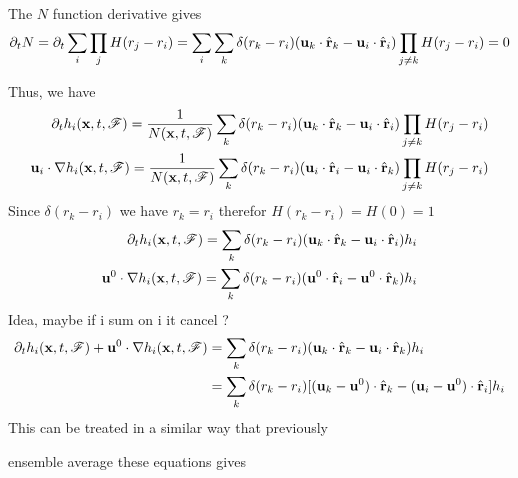 The $N$ function derivative gives 
\begin{equation*}
    \partial_t 
    N 
    = \partial_t 
    \sum_i \prod_j
    H(r_j - r_i)
    = 
    \sum_i 
    \sum_k 
    \delta(r_k - r_i)
    (\textbf{u}_k  \cdot \hat{\textbf{r}}_k - \textbf{u}_i  \cdot \hat{\textbf{r}}_i)
    \prod_{j\neq k}
    H(r_j - r_i) = 0 
\end{equation*}

Thus, we have \citet{zhang2021ensemble} 
\begin{align*}
    \partial_t  h_i(\textbf{x},t,\mathscr{F})
    = 
    \frac{1}{N(\textbf{x},t,\mathscr{F})}
    \sum_k 
    \delta(r_k - r_i)
    (\textbf{u}_k  \cdot \hat{\textbf{r}}_k - \textbf{u}_i  \cdot \hat{\textbf{r}}_i)
    \prod_{j\neq k}
    H(r_j - r_i)
    \\
    \textbf{u}_i \cdot \mathbf{\nabla} h_i(\textbf{x},t,\mathscr{F})
    = 
    \frac{1}{N(\textbf{x},t,\mathscr{F})}
    \sum_k 
    \delta(r_k - r_i)
    (\textbf{u}_i  \cdot \hat{\textbf{r}}_i -  \textbf{u}_i  \cdot\hat{\textbf{r}}_k)
    \prod_{j\neq k}
    H(r_j - r_i)
    \\
\end{align*}
Since $\delta(r_k - r_i)$ we have $r_k = r_i$ therefor $H(r_k - r_i) = H(0) = 1 $
\begin{align*}
    \partial_t  h_i(\textbf{x},t,\mathscr{F})
    = 
    \sum_k 
    \delta(r_k - r_i)
    (\textbf{u}_k  \cdot \hat{\textbf{r}}_k - \textbf{u}_i  \cdot \hat{\textbf{r}}_i)
    h_i
    \\
    \textbf{u}^0 \cdot \mathbf{\nabla} h_i(\textbf{x},t,\mathscr{F})
    = 
    \sum_k 
    \delta(r_k - r_i)
    (\textbf{u}^0  \cdot \hat{\textbf{r}}_i -  \textbf{u}^0  \cdot\hat{\textbf{r}}_k)
    h_i
    \\
\end{align*}
Idea, maybe if i sum on i it cancel ? 
\begin{align*}
    \partial_t  h_i(\textbf{x},t,\mathscr{F}) +\textbf{u}^0 \cdot \mathbf{\nabla} h_i(\textbf{x},t,\mathscr{F})
    &= 
    \sum_k 
    \delta(r_k - r_i)
    (\textbf{u}_k  \cdot \hat{\textbf{r}}_k  - \textbf{u}_i  \cdot \hat{\textbf{r}}_k)
    h_i
    \\
    &= 
    \sum_k 
    \delta(r_k - r_i)
    [(\textbf{u}_k  - \textbf{u}^0) \cdot \hat{\textbf{r}}_k - (\textbf{u}_i - \textbf{u}^0)  \cdot \hat{\textbf{r}}_i]
    h_i
    \\
\end{align*}
This can be treated in a similar way that previously

ensemble average these equations gives 
